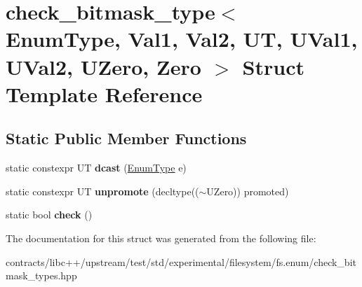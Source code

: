 \hypertarget{structcheck__bitmask__type}{}\section{check\+\_\+bitmask\+\_\+type$<$ Enum\+Type, Val1, Val2, UT, U\+Val1, U\+Val2, U\+Zero, Zero $>$ Struct Template Reference}
\label{structcheck__bitmask__type}
\subsection*{Static Public Member Functions}
\begin{DoxyCompactItemize}
\item 
\mbox{\label{structcheck__bitmask__type_a9767182d05d58a8e0d9ee63591d39993}} 
static constexpr UT {\bfseries dcast} (\mbox{\hyperlink{struct_enum_type}{Enum\+Type}} e)
\item 
\mbox{\label{structcheck__bitmask__type_a6c4171199866b3863b565c98aecedf82}} 
static constexpr UT {\bfseries unpromote} (decltype(($\sim$U\+Zero)) promoted)
\item 
\mbox{\label{structcheck__bitmask__type_a7eaa6149248ec736cfc7d89f84d50b9f}} 
static bool {\bfseries check} ()
\end{DoxyCompactItemize}


The documentation for this struct was generated from the following file\+:\begin{DoxyCompactItemize}
\item 
contracts/libc++/upstream/test/std/experimental/filesystem/fs.\+enum/check\+\_\+bitmask\+\_\+types.\+hpp\end{DoxyCompactItemize}
